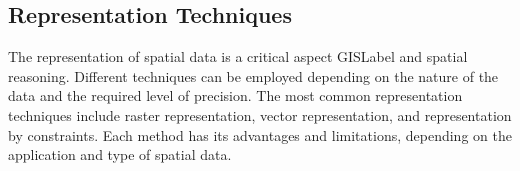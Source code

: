 




\subsection{Representation Techniques}\label{II-subsec:representationTechniques}

The representation of spatial data is a critical aspect \acrshort{GISLabel} and spatial reasoning. Different techniques can be employed depending on the nature of the data and the required level of precision. The most common representation techniques include raster representation, vector representation, and representation by constraints. Each method has its advantages and limitations, depending on the application and type of spatial data.

